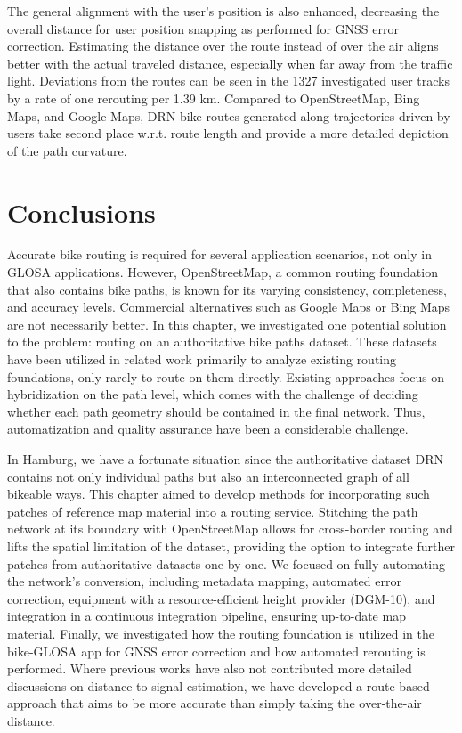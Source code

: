 \begin{Summary}
The general alignment with the user's position is also enhanced, decreasing the overall distance for user position snapping as performed for GNSS error correction. Estimating the distance over the route instead of over the air aligns better with the actual traveled distance, especially when far away from the traffic light. Deviations from the routes can be seen in the 1327 investigated user tracks by a rate of one rerouting per 1.39 km. Compared to OpenStreetMap, Bing Maps, and Google Maps, DRN bike routes generated along trajectories driven by users take second place w.r.t. route length and provide a more detailed depiction of the path curvature.
\end{Summary}

\section{Conclusions}

Accurate bike routing is required for several application scenarios, not only in GLOSA applications. However, OpenStreetMap, a common routing foundation that also contains bike paths, is known for its varying consistency, completeness, and accuracy levels. Commercial alternatives such as Google Maps or Bing Maps are not necessarily better. In this chapter, we investigated one potential solution to the problem: routing on an authoritative bike paths dataset. These datasets have been utilized in related work primarily to analyze existing routing foundations, only rarely to route on them directly. Existing approaches focus on hybridization on the path level, which comes with the challenge of deciding whether each path geometry should be contained in the final network. Thus, automatization and quality assurance have been a considerable challenge. 

In Hamburg, we have a fortunate situation since the authoritative dataset DRN contains not only individual paths but also an interconnected graph of all bikeable ways. This chapter aimed to develop methods for incorporating such patches of reference map material into a routing service. Stitching the path network at its boundary with OpenStreetMap allows for cross-border routing and lifts the spatial limitation of the dataset, providing the option to integrate further patches from authoritative datasets one by one. We focused on fully automating the network's conversion, including metadata mapping, automated error correction, equipment with a resource-efficient height provider (DGM-10), and integration in a continuous integration pipeline, ensuring up-to-date map material. Finally, we investigated how the routing foundation is utilized in the bike-GLOSA app for GNSS error correction and how automated rerouting is performed. Where previous works have also not contributed more detailed discussions on distance-to-signal estimation, we have developed a route-based approach that aims to be more accurate than simply taking the over-the-air distance. 

